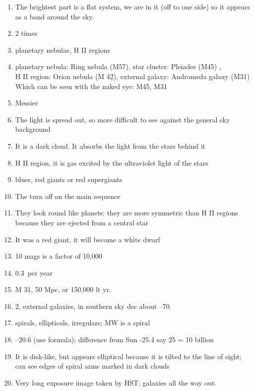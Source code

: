 \documentclass[11pt]{article}
\begin{document}
\begin{enumerate} 

\item
The brightest part is a flat system, we are in it (off to one side) so
it appears as a band around the sky.


\item 
2 times


\item 
planetary nebulae, H II regions

\item 
planetary nebula: Ring nebula (M57),  star cluster: Pleiades (M45) , \\
H II region: Orion nebula (M 42),  external galaxy: Andromeda galaxy (M31)\\
Which can be seen with the naked eye: M45, M31 

\item
Messier


\item 
The light is spread out, so more difficult to see against the general
sky background 


\item 
It is a dark cloud. It absorbs the light from the stars behind it


\item 
H II region, it is gas excited by the ultraviolet light of the stars

\item
bluer, red giants or red supergiants

\item 
The turn off on the main sequence

\item
They look round like planets; they are more symmetric than H II regions
because they are ejected from a central star 

\item 
It was a red giant, it will become a white dwarf


\item 
10 mags is a factor of 10,000 

\item 
0.3\arcsec\ per year


\item 
M 31, 50 Mpc, or 150,000 lt yr.


\item 
2, external galaxies, in southern sky dec about --70\deg.



\item 
spirals, ellipticals, irregulars; MW is a spiral


\item 
--20.6 (use formula); difference from Sun -25.4 say 25 = 10 billion


\item 
It is disk-like, but appears elliptical because it is tilted to the
line of sight; can see edges of spiral arms marked in dark clouds


\item 
Very long exposure image taken by HST; galaxies all the way out.

\end{enumerate} 
\end{document}

